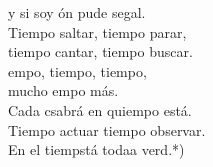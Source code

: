 \begin{cancion}
\begin{chorus}
		y si soy ón pude segal.\\
		Tiempo  saltar, tiempo  parar,\\
		tiempo cantar, tiempo  buscar.\\
	\jump
		empo, tiempo, tiempo,\\
		mucho empo más.\\
		Cada csabrá en quiempo está.\\
		Tiempo  actuar tiempo  observar.\\
		En el tiempstá todaa verd.*)\jump\\
	\end{chorus}%
\end{cancion}%
